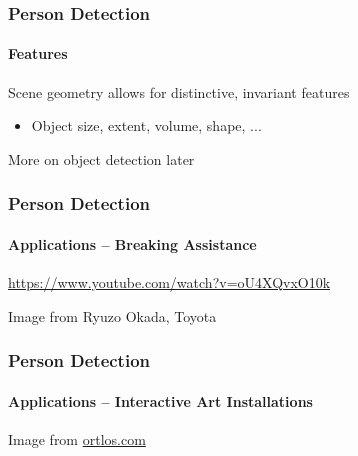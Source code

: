 \documentclass[xetex,professionalfont]{beamer}
\begin{document}

\begin{frame}
\frametitle{Person Detection}
\framesubtitle{Features}

Scene geometry allows for distinctive, invariant features
\begin{itemize}
    \item Object size, extent, volume, shape, ... %
\end{itemize}

\bigskip
More on object detection later

\end{frame}


\begin{frame}
\frametitle{Person Detection}
\framesubtitle{Applications -- Breaking Assistance}

\begin{center}
	\url{https://www.youtube.com/watch?v=oU4XQvxO10k} %
\end{center}

\begin{center}
    {\centering Image from Ryuzo Okada, Toyota}
\end{center}

\end{frame}


\begin{frame}
\frametitle{Person Detection}
\framesubtitle{Applications -- Interactive Art Installations}

\begin{center}
    {\centering Image from \url{ortlos.com}}
\end{center}

\end{frame}
\end{document}
